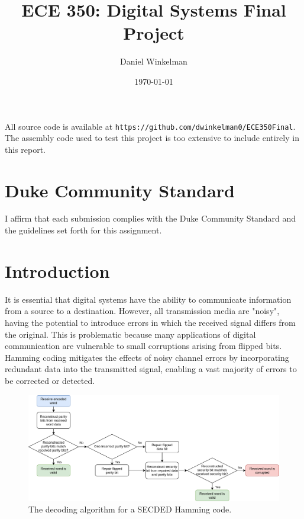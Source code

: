 \documentclass[letterpaper]{article} %
\begin{document}
\title{ECE 350: Digital Systems Final Project}
\author{Daniel Winkelman} %
\date{\today} %
\maketitle
\noindent
All source code is available at \texttt{https://github.com/dwinkelman0/ECE350Final}. The assembly code used to test this project is too extensive to include entirely in this report.

\section*{Duke Community Standard}
I affirm that each submission complies with the Duke Community Standard and the guidelines set forth for this assignment.

\section{Introduction}
It is essential that digital systems have the ability to communicate information from a source to a destination. However, all transmission media are "noisy", having the potential to introduce errors in which the received signal differs from the original. This is problematic because many applications of digital communication are vulnerable to small corruptions arising from flipped bits. Hamming coding mitigates the effects of noisy channel errors by incorporating redundant data into the transmitted signal, enabling a vast majority of errors to be corrected or detected.\\

\begin{figure}
\begin{center}
	\includegraphics[width=1\textwidth]{decoding.png}
	\caption{The decoding algorithm for a SECDED Hamming code.}
	\label{fig:decoding_algorithm}
\end{center}
\end{figure}
\end{document}
